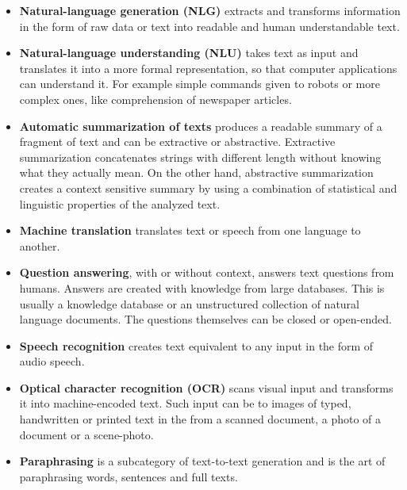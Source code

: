 \begin{itemize}
    \item \textbf{Natural-language generation (NLG)} extracts and transforms information in the form of raw data or text into readable and human understandable text. 
    \item \textbf{Natural-language understanding (NLU)} takes text as input and translates it into a more formal representation, so that computer applications can understand it. For example simple commands given to robots or more complex ones, like comprehension of newspaper articles.
    \item \textbf{Automatic summarization of texts} produces a readable summary of a fragment of text and can be extractive or abstractive. Extractive summarization concatenates strings with different length without knowing what they actually mean. On the other hand, abstractive summarization creates a context sensitive summary by using a combination of statistical and linguistic properties of the analyzed text. \cite{gupta2010survey}
    \item \textbf{Machine translation} translates text or speech from one language to another.
    \item \textbf{Question answering}, with or without context, answers text questions from humans. Answers are created with knowledge from large databases. This is usually a knowledge database or an unstructured collection of natural language documents. The questions themselves can be closed or open-ended.
    \item \textbf{Speech recognition} creates text equivalent to any input in the form of audio speech. 
    \item \textbf{Optical character recognition (OCR)} scans visual input and transforms it into machine-encoded text. Such input can be to images of typed, handwritten or printed text in the from a scanned document, a photo of a document or a scene-photo.
    \item \textbf{Paraphrasing} is a subcategory of text-to-text generation and is the art of paraphrasing words, sentences and full texts.
\end{itemize}

